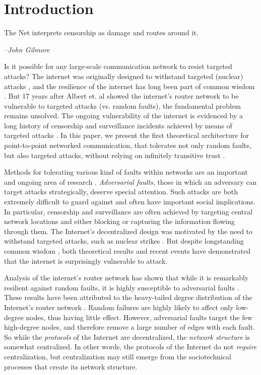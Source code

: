 \documentclass[10pt,letterpaper]{article}
\begin{document}
\linenumbers

\section*{Introduction}

\epigraph{The Net interprets censorship as damage and routes around it.}{\textit{--John Gilmore} \cite{elmer-dewitt_first_1993}}

Is it possible for any large-scale communication network to resist targeted
attacks?
The internet was originally designed to withstand targeted (nuclear) attacks
\cite{baran_distributed_1964},
and the resilience of the internet has long been part of common wisdom
\cite{elmer-dewitt_first_1993}.
But 17 years after Albert et. al \cite{albert_error_2000}
showed the internet's router network to be vulnerable to targeted attacks
(vs. random faults), the fundamental problem remains unsolved.
The ongoing vulnerability of the internet is evidenced by a long history of 
censorship and surveillance incidents achieved by means of targeted attacks
\cite{dainotti_analysis_2011}.
In this paper, we present the first theoretical architecture
for point-to-point networked communication,
that tolerates not only random faults, but also targeted attacks,
without relying on infinitely transitive trust
\cite{christianson_why_1997}.

Methods for tolerating various kind of faults within networks are an
important and ongoing area of research
\cite{zin_survey_2015,albert_error_2000,sterbenz_resilience_2010}.
{\em Adversarial faults},
those in which an adversary can target attacks strategically,
deserve special attention.
Such attacks are both extremely difficult to guard against and 
often have important social implications.
In particular, censorship and surveillance are often achieved
by targeting central network locations and either blocking or capturing
the information flowing through them.
The Internet's decentralized design was motivated
by the need to withstand targeted attacks, such as nuclear strikes
\cite{baran_distributed_1964}.
But despite longstanding common wisdom \cite{elmer-dewitt_first_1993},
both theoretical results and recent events
have demonstrated that the internet is surprisingly vulnerable to attack.

Analysis of the internet's router network has shown that while it
is remarkably resilient against random faults,
it is highly susceptible to adversarial faults \cite{albert_error_2000}.
These results have been attributed to the heavy-tailed
degree distribution of the Internet's router network
\cite{barabasi_emergence_1999,barabasi_scale-free_2009}.
Random failures are highly likely to affect only low-degree nodes,
thus having little effect.
However, adversarial faults target the few high-degree nodes,
and therefore remove a large number of edges with each fault.
So while the {\em protocols} of the Internet are decentralized,
the {\em network structure} is somewhat centralized. 
In other words, the protocols of the Internet do not {\em require}
centralization, but centralization may still emerge from the sociotechnical
processes that create its network structure.
\end{document}
